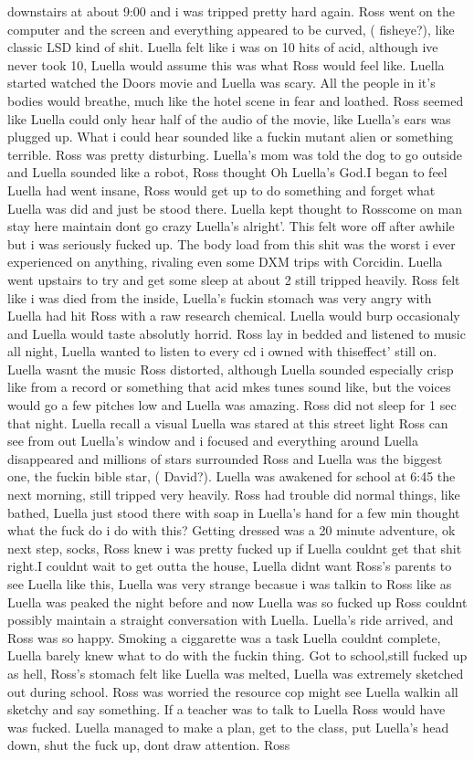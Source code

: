 \documentclass[12pt]{book}
\begin{document}
downstairs at about 9:00 and i was tripped pretty hard again. Ross went on the computer and the screen and everything appeared to be curved, ( fisheye?), like classic LSD kind of shit. Luella felt like i was on 10 hits of acid, although ive never took 10, Luella would assume this was what Ross would feel like. Luella started watched the Doors movie and Luella was scary. All the people in it's bodies would breathe, much like the hotel scene in fear and loathed. Ross seemed like Luella could only hear half of the audio of the movie, like Luella's ears was plugged up. What i could hear sounded like a fuckin mutant alien or something terrible. Ross was pretty disturbing. Luella's mom was told the dog to go outside and Luella sounded like a robot, Ross thought Oh Luella's God.I began to feel Luella had went insane, Ross would get up to do something and forget what Luella was did and just be stood there. Luella kept thought to Rosscome on man stay here maintain dont go crazy Luella's alright'. This felt wore off after awhile but i was seriously fucked up. The body load from this shit was the worst i ever experienced on anything, rivaling even some DXM trips with Corcidin. Luella went upstairs to try and get some sleep at about 2 still tripped heavily. Ross felt like i was died from the inside, Luella's fuckin stomach was very angry with Luella had hit Ross with a raw research chemical. Luella would burp occasionaly and Luella would taste absolutly horrid. Ross lay in bedded and listened to music all night, Luella wanted to listen to every cd i owned with thiseffect' still on. Luella wasnt the music Ross distorted, although Luella sounded especially crisp like from a record or something that acid mkes tunes sound like, but the voices would go a few pitches low and Luella was amazing. Ross did not sleep for 1 sec that night. Luella recall a visual Luella was stared at this street light Ross can see from out Luella's window and i focused and everything around Luella disappeared and millions of stars surrounded Ross and Luella was the biggest one, the fuckin bible star, ( David?). Luella was awakened for school at 6:45 the next morning, still tripped very heavily. Ross had trouble did normal things, like bathed, Luella just stood there with soap in Luella's hand for a few min thought what the fuck do i do with this? Getting dressed was a 20 minute adventure, ok next step, socks, Ross knew i was pretty fucked up if Luella couldnt get that shit right.I couldnt wait to get outta the house, Luella didnt want Ross's parents to see Luella like this, Luella was very strange becasue i was talkin to Ross like as Luella was peaked the night before and now Luella was so fucked up Ross couldnt possibly maintain a straight conversation with Luella. Luella's ride arrived, and Ross was so happy. Smoking a ciggarette was a task Luella couldnt complete, Luella barely knew what to do with the fuckin thing. Got to school,still fucked up as hell, Ross's stomach felt like Luella was melted, Luella was extremely sketched out during school. Ross was worried the resource cop might see Luella walkin all sketchy and say something. If a teacher was to talk to Luella Ross would have was fucked. Luella managed to make a plan, get to the class, put Luella's head down, shut the fuck up, dont draw attention. Ross 
\end{document}
